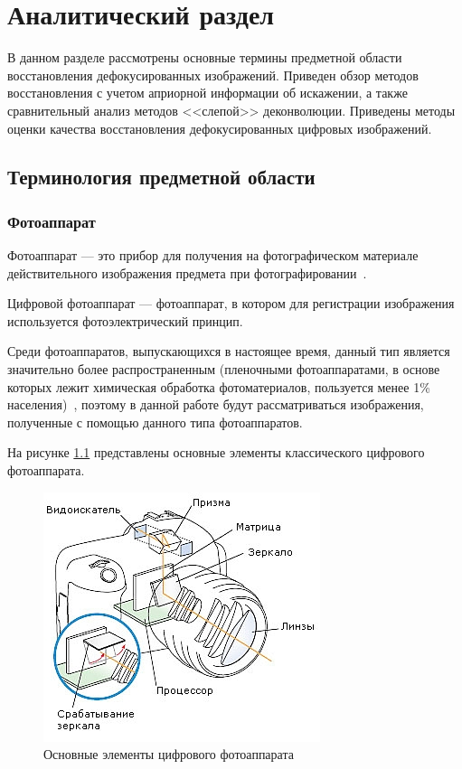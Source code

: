 \chapter{Аналитический раздел}

В данном разделе рассмотрены основные термины предметной области восстановления дефокусированных изображений. Приведен обзор методов восстановления с учетом априорной информации об искажении, а также сравнительный анализ методов <<слепой>> деконволюции. Приведены методы оценки качества восстановления дефокусированных цифровых изображений.

\section{Терминология предметной области}

\subsection{Фотоаппарат}

Фотоаппарат --- это прибор для получения на фотографическом материале действительного изображения предмета при фотографировании~\cite{def1}.

Цифровой фотоаппарат --- фотоаппарат, в котором для регистрации изображения используется фотоэлектрический принцип.

Среди фотоаппаратов, выпускающихся в настоящее время, данный тип является значительно более распространенным (пленочными фотоаппаратами, в основе которых лежит химическая обработка фотоматериалов, пользуется менее 1\% населения)~\cite{dp_percent}, поэтому в данной работе будут рассматриваться изображения, полученные с помощью данного типа фотоаппаратов.

На рисунке \ref{camera} представлены основные элементы классического цифрового фотоаппарата.

\begin{figure}[H]
	\centering
	\includegraphics[scale=0.85]{assets/camera.jpg}
	\caption{Основные элементы цифрового фотоаппарата}
	\label{camera}
\end{figure}

